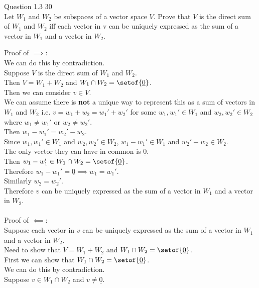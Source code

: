 \documentclass[answers,12pt,addpoints]{exam}
\begin{document}
\begin{questions}
    \question Question 1.3 30\\
    Let $W_1$ and $W_2$ be subspaces of a vector space $V$. Prove that $V$ is the direct sum of $W_1$ and $W_2$ iff each vector in v can be uniquely expressed as the sum of a vector in $W_1$ and a vector in $W_2$.

    \begin{solution}
        Proof of $\implies$:\\
        We can do this by contradiction.\\
        Suppose $V$ is the direct sum of $W_1$ and $W_2$.\\
        Then $V = W_1 + W_2$ and $W_1 \cap W_2 = \setof{\underline{0}}$.\\
        Then we can consider $v \in V$.\\
        We can assume there is \textbf{not} a unique way to represent this as a sum of vectors in $W_1$ and $W_2$ i.e. $v = w_1 + w_2 = w_1' + w_2'$ for some $w_1, w_1' \in W_1$ and $w_2, w_2' \in W_2$ where $w_1 \neq w_1'$ or $w_2 \neq w_2'$.\\
        Then $w_1 - w_1' = w_2' - w_2$.\\
        Since $w_1, w_1' \in W_1$ and $w_2, w_2' \in W_2$, $w_1 - w_1' \in W_1$ and $w_2' - w_2 \in W_2$.\\
        The only vector they can have in common is $\underline{0}$.\\
        Then $w_1 - w_1' \in W_1 \cap W_2 = \setof{\underline{0}}$.\\
        Therefore $w_1 - w_1' = \underline{0} \implies w_1 = w_1'$.\\
        Similarly $w_2 = w_2'$.\\
        Therefore $v$ can be uniquely expressed as the sum of a vector in $W_1$ and a vector in $W_2$.\\\\
        Proof of $\impliedby$:\\
        Suppose each vector in $v$ can be uniquely expressed as the sum of a vector in $W_1$ and a vector in $W_2$.\\
        Need to show that $V = W_1 + W_2$ and $W_1 \cap W_2 = \setof{\underline{0}}$.\\
        First we can show that $W_1 \cap W_2 = \setof{\underline{0}}$.\\
        We can do this by contradiction.\\
        Suppose $v \in W_1 \cap W_2$ and $v \neq \underline{0}$.\\

\end{solution}
\end{questions}
\end{document}
